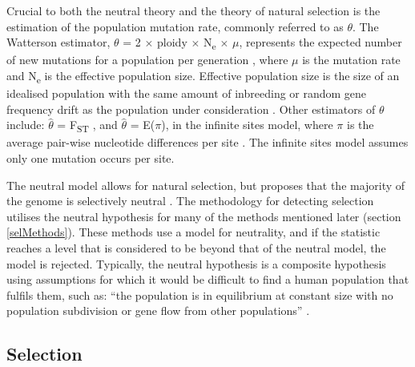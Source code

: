 \documentclass[]{report}
\begin{document}
Crucial to both the neutral theory and the theory of natural selection
is the estimation of the population mutation rate, commonly referred to
as \(\theta\). The Watterson estimator, \(\theta\) = 2 \(\times\) ploidy
\(\times\) N\textsubscript{e} \(\times\) \(\mu\), represents the
expected number of new mutations for a population per generation
\citep{Watterson1975}, where \(\mu\) is the mutation rate and
N\textsubscript{e} is the effective population size. Effective
population size is the size of an idealised population with the same
amount of inbreeding or random gene frequency drift as the population
under consideration \citep{KimuraCrow1963}. Other estimators of
\(\theta\) include: \(\hat{\theta}\) = F\textsubscript{ST}
\citep{Weir1984}, and \(\hat{\theta}\) = E(\(\pi\)), in the infinite
sites model, where \(\pi\) is the average pair-wise nucleotide
differences per site \citep{Tajima1996a}. The infinite sites model
assumes only one mutation occurs per site.

The neutral model allows for natural selection, but proposes that the
majority of the genome is selectively neutral \citep{kimura1979neutral}.
The methodology for detecting selection utilises the neutral hypothesis
for many of the methods mentioned later (section \ref{selMethods}).
These methods use a model for neutrality, and if the statistic reaches a
level that is considered to be beyond that of the neutral model, the
model is rejected. Typically, the neutral hypothesis is a composite
hypothesis using assumptions for which it would be difficult to find a
human population that fulfils them, such as: ``the population is in
equilibrium at constant size with no population subdivision or gene flow
from other populations'' \citep{Nielsen2005a}.

\subsection{Selection}\label{selection}
\end{document}
